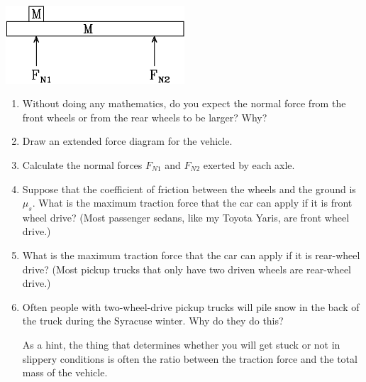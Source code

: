 \documentclass[12pt]{article}
\begin{document}
\begin{center}\includegraphics[width=0.5\textwidth]{car-crop.pdf}\end{center}
\begin{enumerate}

\item Without doing any mathematics, do you expect the normal force from the front wheels 
or from the rear wheels to be larger? Why?

\vspace{1in}

\item Draw an extended force diagram for the vehicle.

\newpage

\item Calculate the normal forces $F_{N1}$ and $F_{N2}$ exerted by each axle.

\vspace{3in}

\item Suppose that the coefficient of friction between the wheels and the ground is $\mu_s$. What is the maximum
traction force that the car can apply if it is front wheel drive? (Most passenger sedans, like my Toyota Yaris,
are front wheel drive.)

\vspace{3.5in}

\item What is the maximum traction force that the car can apply if it is rear-wheel drive? (Most pickup trucks that
only have two driven wheels are rear-wheel drive.)

\vspace{3.5in}

\item Often people with two-wheel-drive pickup trucks will pile snow in the back of the truck during the Syracuse winter.
Why do they do this?

As a hint, the thing that determines whether you will get stuck or not in slippery conditions is often the ratio between
the traction force and the total mass of the vehicle.



\end{enumerate}
\newpage
\Large
\centerline{}
\normalsize
\centerline{}
\end{document}
